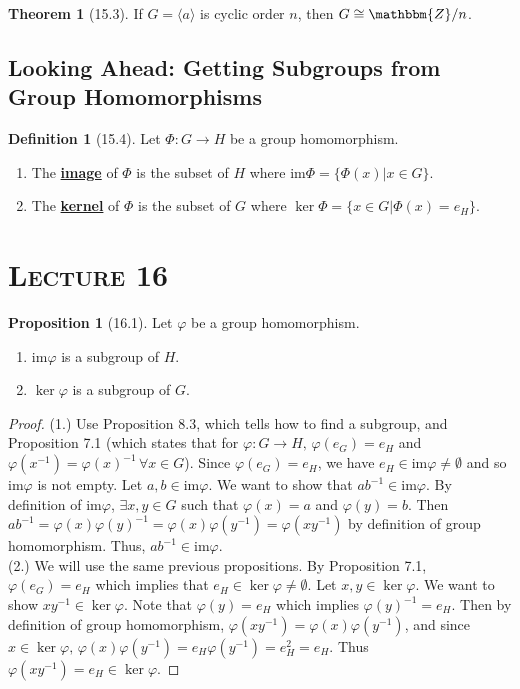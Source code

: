 \documentclass{article}
\newcommand{\Z}{\mathbbm{Z}}
\newcommand{\es}{\emptyset}
\newcommand{\inverse}[1]{#1^{-1}}
\newcommand{\define}[1]{\textbf{\underline{#1}}}
\newcommand{\func}[3]{#1: #2 \to #3}
\theoremstyle{definition}
\newtheorem*{defn}{Definition}
\newtheorem*{thm}{Theorem}
\newtheorem*{prop}{Proposition}
\theoremstyle{remark}
\newcommand{\cyc}[1]{\langle#1\rangle}
\newcommand{\im}{\mathrm{im}}
\newcommand{\iso}{\cong}
\begin{document}
{{            \begin{thm}[15.3]
                If $G=\cyc{a}$ is cyclic order $n$, then $G\iso \Z/n$.
            \end{thm}
        }
        \subsection*{Looking Ahead: Getting Subgroups from Group Homomorphisms}{
            \begin{defn}[15.4]
                Let $\func{\Phi}{G}{H}$ be a group homomorphism.
                \begin{enumerate}
                    \item The \define{image} of $\Phi$ is the subset of $H$ where $\im{\Phi}=\{\Phi(x)|x\in G\}$.
                    \item The \define{kernel} of $\Phi$ is the subset of $G$ where $\ker{\Phi}=\{x\in G|\Phi(x)=e_H\}$.
                \end{enumerate}
            \end{defn}
        }
    }
    
    \section*{\textbf{\textsc{Lecture 16}}}{
         \begin{prop}[16.1]
            Let $\varphi$ be a group homomorphism.
            \begin{enumerate}
                \item $\im\varphi$ is a subgroup of $H$.
                \item $\ker\varphi$ is a subgroup of $G$.
            \end{enumerate}
         \end{prop}
         
         \begin{proof}
             (1.) Use Proposition 8.3, which tells how to find a subgroup, and Proposition 7.1 (which states that for $\func{\varphi}{G}{H}, \, \varphi(e_G)=e_H$ and $\varphi(\inverse{x})=\inverse{\varphi(x)} \, \forall x\in G$).
             Since $\varphi(e_G)=e_H$, we have $e_H \in \im\varphi \neq \es$ and so $\im \varphi$ is not empty. Let $a,b \in \im \varphi$. We want to show that $a\inverse{b} \in \im\varphi$. By definition of $\im \varphi$, $\exists x,y \in G$ such that $\varphi(x)=a$ and $\varphi(y)=b$. Then $a\inverse{b}=\varphi(x)\inverse{\varphi(y)}=\varphi(x)\varphi(\inverse{y})=\varphi(x\inverse{y})$ by definition of group homomorphism. Thus, $a\inverse{b} \in \im\varphi$.\\
             (2.) We will use the same previous propositions. By Proposition 7.1, $\varphi(e_G)=e_H$ which implies that $e_H \in \ker\varphi \neq \es$. Let $x,y\in \ker\varphi$. We want to show $x\inverse{y}\in \ker\varphi$. Note that $\varphi(y)=e_H$ which implies $\inverse{\varphi(y)}=e_H$. Then by definition of group homomorphism, $\varphi(x\inverse{y})=\varphi(x)\varphi(\inverse{y})$, and since $x\in \ker\varphi, \, \varphi(x)\varphi(\inverse{y})=e_H\varphi(\inverse{y})=e_H^2=e_H$. Thus $\varphi(x\inverse{y})=e_H \in \ker\varphi$.
         \end{proof}
    }
    
\end{document}
